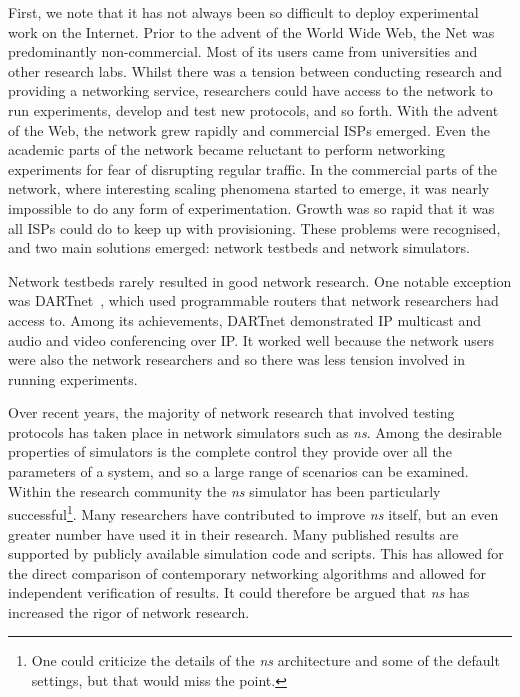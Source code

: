First, we note that it has not always been so difficult to deploy
experimental work on the Internet.
Prior to the advent of the World Wide Web, the Net was
predominantly non-commercial.  Most of its users came from
universities and other research labs.  Whilst there was a tension
between conducting research and providing a networking service,
researchers could have access to the network to run experiments, develop
and test new protocols, and so forth.
With the advent of the Web, the network grew rapidly and commercial
ISPs emerged.  Even the academic parts of the network became reluctant
to perform networking experiments for fear of disrupting regular
traffic.  In the commercial parts of the network, where interesting
scaling phenomena started to emerge, it was nearly impossible to do
any form of experimentation.  Growth was so rapid that it was all ISPs
could do to keep up with provisioning.
These problems were recognised, and two main solutions emerged:
network testbeds and network simulators.

Network testbeds rarely resulted in good network research.  One
notable exception was DARTnet~\cite{dartnet}, which used programmable routers that
network researchers had access to.  Among its achievements, DARTnet
demonstrated IP multicast and audio and video conferencing over IP.
It 
worked well because the network users were also the network
researchers and so there was less tension involved in running
experiments.

Over recent years, the majority of network research that
involved testing protocols has taken place in network simulators such
as {\em ns}.  Among the desirable properties of simulators is the
complete control they provide over all the parameters of a system, and
so a
large range of scenarios can be examined.  Within the research
community the \emph{ns} simulator has been particularly successful\footnote{
One could criticize the details of the {\em ns}
architecture and some of the default settings, but that would miss the
point.  }.  
Many researchers have contributed to improve {\em ns}
itself, but an even greater number have used it in their research.
Many published results are supported by publicly available simulation
code and scripts.  This has allowed for the direct comparison of
contemporary networking algorithms and allowed for independent
verification of results.  It could therefore be argued that {\em ns}
has increased the rigor of network research.


